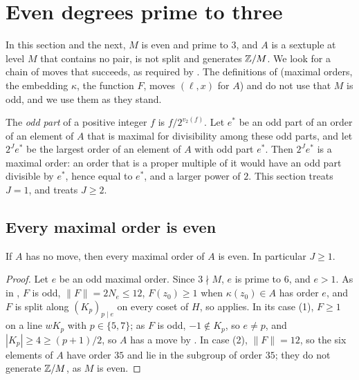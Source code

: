 \section{Even degrees prime to three}\label{sec:even}

In this section and the next, $M$ is even and prime to $3$, and $A$ is a
sextuple at level $M$ that contains no pair, is not split and generates
$\mathbb{Z}/M$. We look for a chain of moves that succeeds, as required by
. The definitions of  (maximal orders, the
embedding $\kappa$, the function $F$, moves $(\ell,x)$ for $A$) and
 do not use that $M$ is odd, and
we use them as they stand.

The \emph{odd part} of a positive integer $f$ is $f/2^{v_{2}(f)}$. Let
$e^{*}$ be an odd part of an order of an element of $A$ that is maximal for
divisibility among these odd parts, and let $2^{J}e^{*}$ be the largest order
of an element of $A$ with odd part $e^{*}$. Then $2^{J}e^{*}$ is a maximal
order: an order that is a proper multiple of it would have an odd part
divisible by $e^{*}$, hence equal to $e^{*}$, and a larger power of $2$. This
section treats $J=1$, and  treats $J\ge2$.

\subsection{Every maximal order is even}

\begin{lemma}\label{lem:maxeven}
If $A$ has no move, then every maximal order of $A$ is even. In particular
$J\ge1$.
\end{lemma}

\begin{proof}
Let $e$ be an odd maximal order. Since $3\nmid M$, $e$ is prime to $6$, and
$e>1$. As in , $F$ is odd, $\|F\|=2N_{e}\le12$, $F(z_{0})\ge1$
when $\kappa(z_{0})\in A$ has order $e$, and $F$ is split along
$(K_{p})_{p\mid e}$ on every coset of $H$, so  applies. In its
case (1), $F\ge1$ on a line $wK_{p}$ with $p\in\{5,7\}$; as $F$ is odd,
$-1\notin K_{p}$, so $e\ne p$, and $|K_{p}|\ge4\ge(p+1)/2$, so $A$ has a move
by . In case (2), $\|F\|=12$, so the six elements of $A$
have order $35$ and lie in the subgroup of order $35$; they do not generate
$\mathbb{Z}/M$, as $M$ is even.
\end{proof}

